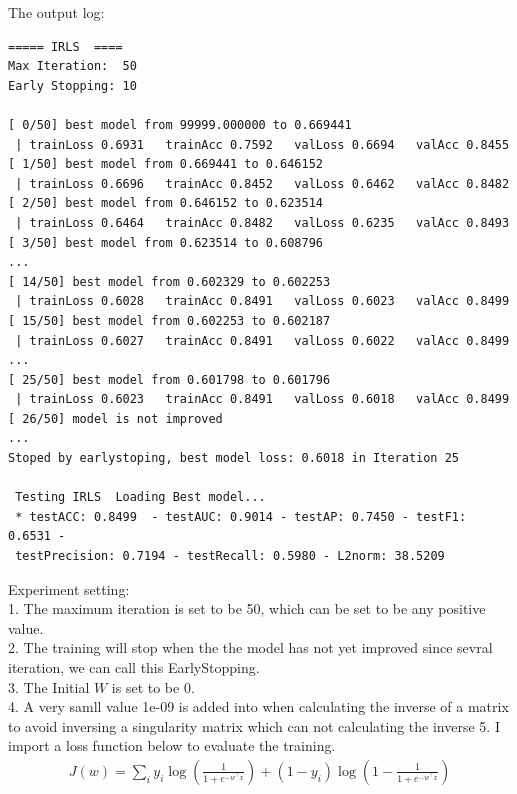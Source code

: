 \documentclass[a4paper]{article}
\begin{document}
The output log:
\begin{verbatim}
===== IRLS  ====
Max Iteration:  50
Early Stopping: 10

[ 0/50] best model from 99999.000000 to 0.669441 
 | trainLoss 0.6931   trainAcc 0.7592   valLoss 0.6694   valAcc 0.8455
[ 1/50] best model from 0.669441 to 0.646152 
 | trainLoss 0.6696   trainAcc 0.8452   valLoss 0.6462   valAcc 0.8482
[ 2/50] best model from 0.646152 to 0.623514 
 | trainLoss 0.6464   trainAcc 0.8482   valLoss 0.6235   valAcc 0.8493
[ 3/50] best model from 0.623514 to 0.608796 
...
[ 14/50] best model from 0.602329 to 0.602253 
 | trainLoss 0.6028   trainAcc 0.8491   valLoss 0.6023   valAcc 0.8499
[ 15/50] best model from 0.602253 to 0.602187 
 | trainLoss 0.6027   trainAcc 0.8491   valLoss 0.6022   valAcc 0.8499
...
[ 25/50] best model from 0.601798 to 0.601796 
 | trainLoss 0.6023   trainAcc 0.8491   valLoss 0.6018   valAcc 0.8499
[ 26/50] model is not improved
...
Stoped by earlystoping, best model loss: 0.6018 in Iteration 25 

 Testing IRLS  Loading Best model...
 * testACC: 0.8499  - testAUC: 0.9014 - testAP: 0.7450 - testF1: 0.6531 - 
 testPrecision: 0.7194 - testRecall: 0.5980 - L2norm: 38.5209
\end{verbatim}


Experiment setting:\\
1. The maximum iteration is set to be 50, which can be set to be any positive value.\\
2. The training will stop when the the model has not yet improved since sevral iteration, we can call this EarlyStopping.\\
3. The Initial $W$ is set to be 0.\\
4. A very samll value 1e-09 is added into when calculating the inverse of a matrix to avoid inversing a singularity matrix which can not calculating the inverse
5. I import a loss function below to evaluate the training.
\begin{equation}
    \begin{aligned}
    J(w) = \sum_{i} {y_i \log{(\frac{1}{1+e^{-w^{\top}x}})} +(1-y_i) \log{(1-\frac{1}{1+e^{-w^{\top}x}})}} 
    \end{aligned}
\end{equation}
\end{document}
